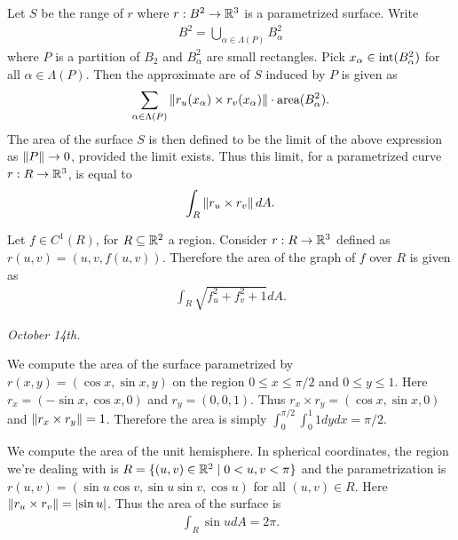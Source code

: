 Let $S$ be the range of $r$ where $r:B^{2} \to \mathbb{R}^{3}$ is a parametrized surface. Write
\begin{align}
    B^{2} = \bigcup_{\alpha \in \Lambda(P)} B_{\alpha}^{2}
\end{align}
where $P$ is a partition of $B_{2}$ and $B_{\alpha}^{2}$ are small rectangles. Pick $x_{\alpha} \in \operatorname{int}(B_{\alpha}^{2})$ for all $\alpha \in \Lambda(P)$. Then the approximate are of $S$ induced by $P$ is given as
\begin{align}
    \sum_{\alpha \in \Lambda(P)} \left\lVert r_{u}(x_{\alpha}) \times r_{v}(x_{\alpha})\right\rVert \cdot \text{area}(B_{\alpha}^{2}).
\end{align}
The area of the surface $S$ is then defined to be the limit of the above expression as $\left\lVert P\right\rVert \to 0$, provided the limit exists. Thus this limit, for a parametrized curve $r:R \to \mathbb{R}^{3}$, is equal to
\begin{align}
    \int_{R} \left\lVert r_{u} \times r_{v}\right\rVert dA.
\end{align}
\begin{example}
    Let $f \in C^{1}(R)$, for $R \subseteq \mathbb{R}^{2}$ a region.
    Consider $r:R \to \mathbb{R}^{3}$ defined as $r(u,v) = (u,v,f(u,v))$. Therefore the area of the graph of $f$ over $R$ is given as
    \begin{align}
        \int_{R}\sqrt{f_{u}^{2} + f_{v}^{2} + 1} dA.
    \end{align}
\end{example}

\textit{October 14th.}

\begin{example}
    We compute the area of the surface parametrized by $r(x,y) = (\cos x, \sin x, y)$ on the region $0 \leq x \leq \pi/2$ and $0 \leq y \leq 1$. Here $r_{x} = (-\sin x, \cos x, 0)$ and $r_{y} = (0,0,1)$. Thus $r_{x} \times r_{y} = (\cos x, \sin x, 0)$ and $\left\lVert r_{x} \times r_{y}\right\rVert = 1$. Therefore the area is simply $\int_{0}^{\pi/2} \int_{0}^{1} 1 dy dx = \pi/2$.
\end{example}

\begin{example}
    We compute the area of the unit hemisphere. In spherical coordinates, the region we're dealing with is $R = \{(u,v) \in \mathbb{R}^{2} \mid 0 < u,v < \pi\}$ and the parametrization is $r(u,v) = (\sin u \cos v, \sin u \sin v, \cos u)$ for all $(u,v) \in R$. Here $\left\lVert r_{u} \times r_{v}\right\rVert = \left| \sin u \right|$. Thus the area of the surface is
    \begin{align}
        \int_{R} \sin u dA = 2\pi.
    \end{align}
\end{example}

